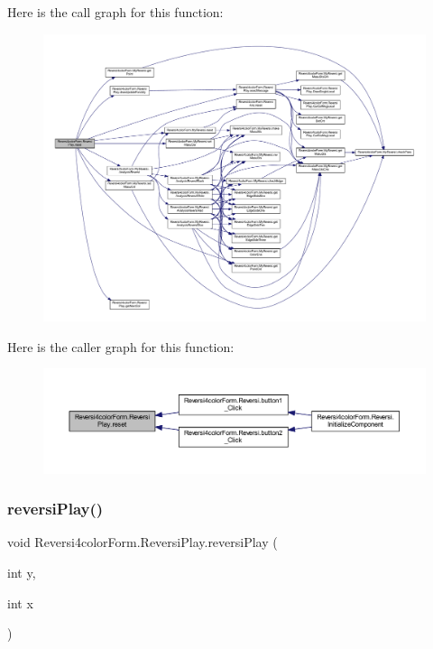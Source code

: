 Here is the call graph for this function\+:
\nopagebreak
\begin{figure}[H]
\begin{center}
\leavevmode
\includegraphics[width=350pt]{class_reversi4color_form_1_1_reversi_play_a32c01f1f57a7413cd5173637800f74b7_cgraph}
\end{center}
\end{figure}
Here is the caller graph for this function\+:
\nopagebreak
\begin{figure}[H]
\begin{center}
\leavevmode
\includegraphics[width=350pt]{class_reversi4color_form_1_1_reversi_play_a32c01f1f57a7413cd5173637800f74b7_icgraph}
\end{center}
\end{figure}
\mbox{\label{class_reversi4color_form_1_1_reversi_play_a88c4cd228512f02a940fbe147c9d75c3}} 
\subsubsection{\texorpdfstring{reversi\+Play()}{reversiPlay()}}
{\footnotesize\ttfamily void Reversi4color\+Form.\+Reversi\+Play.\+reversi\+Play (\begin{DoxyParamCaption}\item[{int}]{y,  }\item[{int}]{x }\end{DoxyParamCaption})}




